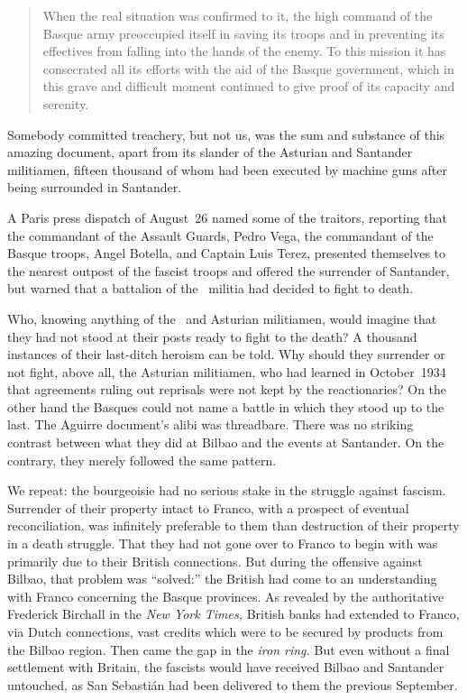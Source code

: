 \begin{quotation}
  When the real situation was confirmed to it, the high command of the Basque army preoccupied itself in saving its troops and in preventing its effectives from falling into the hands of the enemy. To this mission it has consecrated all its efforts with the aid of the Basque government, which in this grave and difficult moment continued to give proof of its capacity and serenity.%
\end{quotation}

Somebody committed treachery\kn, but not us, was the sum and substance of this amazing document, apart from its slander of the Asturian and Santander militiamen, fifteen thousand of whom had been executed by machine guns after being surrounded in Santander.

A Paris press dispatch of August~26 named some of the traitors, reporting that the commandant of the Assault Guards, Pedro Vega, the commandant of the Basque troops, Angel Botella, and Captain Luis Terez, presented themselves to the nearest outpost of the fascist troops and offered the surrender of Santander, but warned that a battalion of the \FAI\ militia had decided to fight to death.

\begin{sloppypar}
  Who, knowing anything of the \CNT\ and Asturian militiamen, would imagine that they had not stood at their posts ready to fight to the death? A thousand instances of their last-ditch heroism can be told. Why should they surrender or not fight, above all, the Asturian militiamen, who had learned in October~1934 that agreements ruling out reprisals were not kept by the reactionaries? On the other hand the Basques could not name a battle in which they stood up to the last. The Aguirre document’s alibi was threadbare. There was no striking contrast between what they did at Bilbao and the events at Santander. On the contrary, they merely followed the same pattern.
\end{sloppypar}

We repeat: the bourgeoisie had no serious stake in the struggle against fascism. Surrender of their property intact to Franco, with a prospect of eventual reconciliation, was infinitely preferable to them than destruction of their property in a death struggle. That they had not gone over to Franco to begin with was primarily due to their British connections. But during the offensive against Bilbao, that problem was ``solved:'' the British had come to an understanding with Franco concerning the Basque provinces. As revealed by the authoritative Frederick Birchall in the \emph{New York Times,} British banks had extended to Franco, via Dutch connections, vast credits which were to be secured by products from the Bilbao region. Then came the gap in the \emph{iron ring.} But even without a final settlement with Britain, the fascists would have received Bilbao and Santander untouched, as San Sebasti\'an had been delivered to them the previous September.

